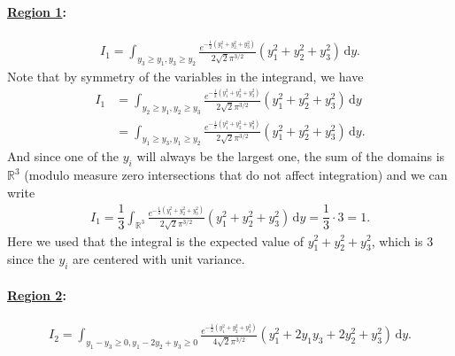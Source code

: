 \documentclass[11pt]{article}
\numberwithin{equation}{section}
\numberwithin{figure}{section}
\begin{document}
\paragraph{\underline{Region 1}:}
\begin{align*}
    I_1 = \int_{y_3 \geq y_1, y_3 \geq y_2}  \frac{e^{-\frac{1}{2}(y_1^2 + y_2^2 +y_3^2)}}{2 \sqrt{2} \pi ^{3/2}} (y_1^2 + y_2^2 + y_3^2) \, \mathrm{d}y.
\end{align*}
Note that by symmetry of the variables in the integrand,
we have
\begin{align*}
    I_1 
    &= \int_{y_2 \geq y_1, y_2 \geq y_3}  \frac{e^{-\frac{1}{2}(y_1^2 + y_2^2 +y_3^2)}}{2 \sqrt{2} \pi ^{3/2}} (y_1^2 + y_2^2 + y_3^2) \, \mathrm{d}y \\
    &= \int_{y_1 \geq y_3, y_1 \geq y_2}  \frac{e^{-\frac{1}{2}(y_1^2 + y_2^2 +y_3^2)}}{2 \sqrt{2} \pi ^{3/2}} (y_1^2 + y_2^2 + y_3^2) \, \mathrm{d}y.
\end{align*}
And since one of the $y_i$ will always be the largest one, the sum of the domains is $\mathbb R^3$ (modulo measure zero intersections that do not affect integration) and we can write 
\begin{align*}
        I_1 = \dfrac 1  3 \int_{\mathbb R^3}  \frac{e^{-\frac{1}{2}(y_1^2 + y_2^2 +y_3^2)}}{2 \sqrt{2} \pi ^{3/2}} (y_1^2 + y_2^2 + y_3^2) \, \mathrm{d}y = \dfrac 1 3 \cdot 3 = 1.
\end{align*}
Here we used that the integral is the expected value of $y_1^2 + y_2^2 + y_3^2$, which is 3
 since the $y_i$ are centered with unit variance.
 
\paragraph{\underline{Region 2}:}
\begin{align}\label{eqi2}
    I_2 = \int_{y_1-y_3\geq 0, y_1-2 y_2+y_3\geq 0 }  \frac{e^{-\frac{1}{2}(y_1^2 + y_2^2 +y_3^2)}}{4 \sqrt{2} \pi ^{3/2}}  \left(y_1^2+2 y_1 y_3+2 y_2^2+y_3^2\right) \, \mathrm{d}y.
\end{align}
\end{document}
